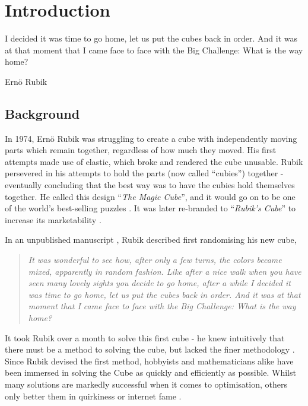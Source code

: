\documentclass{report}
\newcommand{\tit}[1]{\textit{#1}}
\newcommand{\propernoun}[1]{\enquote{\tit{#1}}}
\begin{document}
	\newpage
	\tableofcontents
   	\listoffigures
	\listoftables
	\lstlistoflistings

	\newpage
	\renewcommand{\thechapter}{\arabic{chapter}}
	\setcounter{chapter}{0}
	\chapter{Introduction}
	\epigraph{I decided it was time to go home, let us put the cubes back in order. And it was at that moment that I came face to face with the Big Challenge: What is the way home?}{Ern\"{o} Rubik \cite{Rubik1986}}
	
    \section{Background}

    In 1974, Ern\"{o} Rubik was struggling to create a cube with independently moving parts which remain together, regardless of how much they moved. His first attempts made use of elastic, which broke and rendered the cube unusable. Rubik persevered in his attempts to hold the parts (now called \enquote{cubies}) together - eventually concluding that the best way was to have the cubies hold themselves together. He called this design \propernoun{The Magic Cube}, and it would go on to be one of the world's best-selling puzzles \cite{Waxman2014}. It was later re-branded to \propernoun{Rubik's Cube} to increase its marketability \cite{IdealToyCompany1980}.
    
    In an unpublished manuscript \cite{Rubik1986}, Rubik described first randomising his new cube, 
    
    \blockquote{\tit{It was wonderful to see how, after only a few turns, the colors became mixed, apparently in random fashion. Like after a nice walk when you have seen many lovely sights you decide to go home, after a while I decided it was time to go home, let us put the cubes back in order. And it was at that moment that I came face to face with the Big Challenge: What is the way home?}}
    
    It took Rubik over a month to solve this first cube - he knew intuitively that there must be a method to solving the cube, but lacked the finer methodology \cite{RubiksCube2017}. Since Rubik devised the first method, hobbyists and mathematicians alike have been immersed in solving the Cube as quickly and efficiently as possible. Whilst many solutions are markedly successful when it comes to optimisation, others only better them in quirkiness or internet fame \cite{Chan2016}.
    
\end{document}
